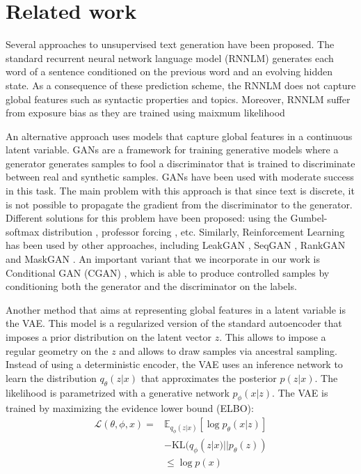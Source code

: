 \documentclass[11pt,letterpaper]{article}
\begin{document}
\section{Related work}

Several approaches to unsupervised text generation have been proposed. The standard recurrent neural network language model (RNNLM) \cite{mikolov2011extensions} generates each word of a sentence conditioned on the previous word and an evolving hidden state. As a consequence of these prediction scheme, the RNNLM does not capture global features such as syntactic properties and topics. Moreover, RNNLM suffer from exposure bias as they are trained using maixmum likelihood \cite{bowman2015generating}

An alternative approach uses models that capture global features in a continuous latent variable. GANs are a framework for training generative models  where a generator generates samples to fool a discriminator that is trained to discriminate between real and synthetic samples. GANs have been used with moderate success in this task. The main problem with this approach is that since text is discrete, it is not possible to propagate the gradient from the discriminator to the generator. Different solutions for this problem have been proposed: using the Gumbel-softmax distribution \cite{kusner2016gans}, professor forcing \cite{lamb2016professor}, etc. Similarly, Reinforcement Learning has been used by other approaches, including LeakGAN \cite{guo2017long}, SeqGAN \cite{yu2017seqgan}, RankGAN \cite{lin2017adversarial} and MaskGAN \cite{fedus2018maskgan}. An important variant that we incorporate in our work is Conditional GAN (CGAN) \cite{mirza2014conditional}, which is able to produce controlled samples by conditioning both the generator and the discriminator on the labels.

Another method that aims at representing global features in a latent variable is the VAE. This model is a regularized version of the standard autoencoder that imposes a prior distribution on the latent vector $z$. This allows to impose a regular geometry on the $z$ and allows to draw samples via ancestral sampling. Instead of using a deterministic encoder, the VAE uses an inference network to learn the distribution $q_{\theta}(z|x)$ that approximates the posterior $p(z|x)$. The likelihood is parametrized with a generative network $p_{\phi}(x|z)$. The VAE is trained by maximizing the evidence lower bound (ELBO):
\begin{align}
    \mathcal{L}(\theta, \phi, x) = &\mathbb{E}_{q_{\phi}(z|x)} [ \log p_{\theta}(x|z) ] \nonumber \\
    &- \text{KL}(q_{\phi}(z|x) || p_{\theta}(z)) \\ 
    & \leq \log p(x) \nonumber
\end{align}
\end{document}
